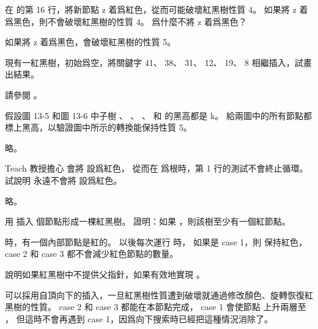 \startsection[
  title={Insertion},
]

\startEXERCISE
在  的第 16 行，將新節點 z 着爲紅色，從而可能破壞紅黑樹性質 4。
如果將 z 着爲黑色，則不會破壞紅黑樹的性質 4。
爲什麼不將 z 着爲黑色？
\stopEXERCISE

\startANSWER
如果將 z 着爲黑色，會破壞紅黑樹的性質 5。
\stopANSWER

\startEXERCISE
現有一紅黑樹，初始爲空，將關鍵字 41、 38、 31、 12、 19、 8 相繼插入，試畫出結果。
\stopEXERCISE

\startANSWER
請參閱 。

\externalfigure[output/e13_3_2-1]
\stopANSWER

\startEXERCISE
假設圖 13-5 和圖 13-6 中子樹 \m{\alpha}、 \m{\beta}、 \m{\gamma}、 \m{\delta} 和 \m{\epsilon} 的黑高都是 k。
給兩圖中的所有節點都標上黑高，以驗證圖中所示的轉換能保持性質 5。
\stopEXERCISE

\startANSWER
略。
\stopANSWER

\startEXERCISE
Teach 教授擔心  會將  設爲紅色，
從而在  爲根時，第 1 行的測試不會終止循環。
試說明  永遠不會將  設爲紅色。
\stopEXERCISE

\startANSWER
略。
\stopANSWER

\startEXERCISE
用  插入  個節點形成一棵紅黑樹。
證明：如果 ，則該樹至少有一個紅節點。
\stopEXERCISE

\startANSWER
{} 時，有一個內部節點是紅的。
以後每次運行  時，
如果是 case 1，則  保持紅色，case 2 和 case 3 都不會減少紅色節點的數量。
\stopANSWER

\startEXERCISE
說明如果紅黑樹中不提供父指針，如果有效地實現 。
\stopEXERCISE

\startANSWER
可以採用自頂向下的插入，一旦紅黑樹性質遭到破壞就通過修改顏色、旋轉恢復紅黑樹的性質。
 case 2 和 case 3 都能在本節點完成，
 case 1 會使節點  上升兩層至 ，
但這時不會再遇到 case 1，因爲向下搜索時已經把這種情況消除了。
\stopANSWER

\stopsection
